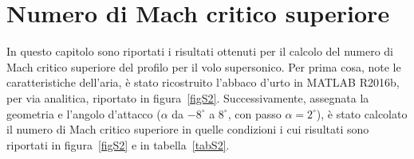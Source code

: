
\chapter{Numero di Mach critico superiore \Msup}
In questo capitolo sono riportati i risultati ottenuti per il calcolo del numero di Mach critico superiore \Msup del profilo per il volo supersonico. Per prima cosa, note le caratteristiche dell'aria, è stato ricostruito l'abbaco d'urto in MATLAB R2016b, per via analitica, riportato in figura~\vref{figS2}.
Successivamente, assegnata la geometria e l'angolo d'attacco ($\alpha$ da $-8^{\circ}$ a $8^{\circ}$, con passo $\alpha=2^{\circ}$), è stato calcolato il numero di Mach critico superiore in quelle condizioni i cui risultati sono riportati in figura~\vref{figS2} e in tabella~\vref{tabS2}.

